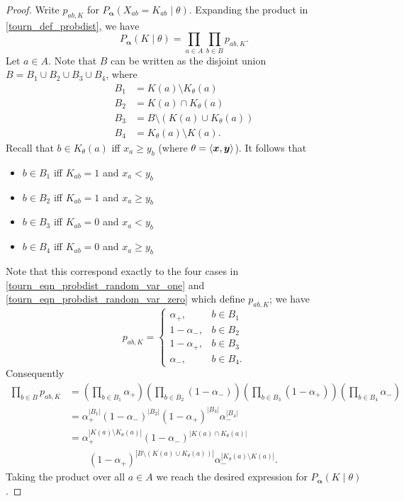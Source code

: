 \begin{proof}
    Write $p_{ab,K}$ for $P_{\bm{\alpha}}(X_{ab} = K_{ab} \mid \theta)$.
    Expanding the product in \cref{tourn_def_probdist}, we have
    \[
       P_{\bm{\alpha}}(K \mid \theta)
       = \prod_{a \in A}{\prod_{b \in B}{p_{ab,K}}}.
    \]
    Let $a \in A$. Note that $B$ can be written as the disjoint
    union $B = B_1 \cup B_2 \cup B_3 \cup B_4$, where
    \[
       \begin{aligned}
          B_1 &= K(a) \setminus K_\theta(a) \\
          B_2 &= K(a) \cap K_\theta(a) \\
          B_3 &= B \setminus (K(a) \cup K_\theta(a)) \\
          B_4 &= K_\theta(a) \setminus K(a).
       \end{aligned}
    \]
    Recall that $b \in K_\theta(a)$ iff $x_a \ge y_b$
    (where $\theta = \langle {\bm{x}, \bm{y}} \rangle$).  It follows that
    \begin{itemize}
        \item $b \in B_1$ iff $K_{ab} = 1$ and $x_a < y_b$
        \item $b \in B_2$ iff $K_{ab} = 1$ and $x_a \ge y_b$
        \item $b \in B_3$ iff $K_{ab} = 0$ and $x_a < y_b$
        \item $b \in B_4$ iff $K_{ab} = 0$ and $x_a \ge y_b$
    \end{itemize}
    Note that this correspond exactly to the four cases in
    \cref{tourn_eqn_probdist_random_var_one} and
    \cref{tourn_eqn_probdist_random_var_zero} which define $p_{ab, K}$; we have
    \[
        p_{ab,K} = \begin{cases}
            \alpha_+,& b \in B_1 \\
            1 - \alpha_-,& b \in B_2 \\
            1 - \alpha_+,& b \in B_3 \\
            \alpha_-,& b \in B_4.
        \end{cases}
    \]
    Consequently
    \[
       \begin{aligned}
           \prod_{b \in B}{p_{ab,K}}
           &=
               \left(\prod_{b \in B_1}{\alpha_+}\right)
               \left(\prod_{b \in B_2}{(1-\alpha_-)}\right)
               \left(\prod_{b \in B_3}{(1-\alpha_+)}\right)
               \left(\prod_{b \in B_4}{\alpha_-}\right)
           \\
           &= \alpha_+^{|B_1|} (1-\alpha_-)^{|B_2|} (1-\alpha_+)^{|B_3|}
              \alpha_-^{|B_4|} \\
           &= \alpha_+^{|K(a) \setminus K_\theta(a)|}
              (1-\alpha_-)^{|K(a) \cap K_\theta(a)|}
              \\
           &\quad \quad (1-\alpha_+)^{|B \setminus (K(a) \cup K_\theta(a))|}
              \alpha_-^{|K_\theta(a) \setminus K(a)|}.
       \end{aligned}
    \]
    Taking the product over all $a \in A$ we reach the desired
    expression for $P_{\bm{\alpha}}(K \mid \theta)$.
\end{proof}


